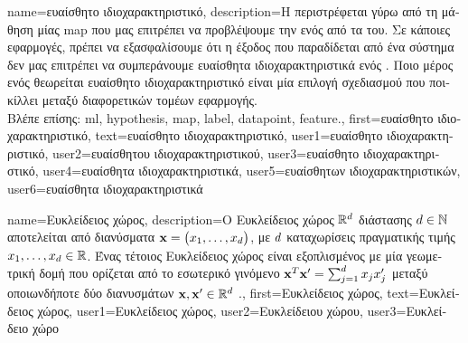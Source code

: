 {name={\foreignlanguage{greek}{ευαίσθητο ιδιοχαρακτηριστικό}},
	description={\foreignlanguage{greek}{Η}  
		\foreignlanguage{greek}{περιστρέφεται γύρω από τη μάθηση μίας} \gls{map}  
		\foreignlanguage{greek}{που μας επιτρέπει να προβλέψουμε την}  \foreignlanguage{greek}{ενός} 
		 \foreignlanguage{greek}{από τα}  \foreignlanguage{greek}{του}. 
		\foreignlanguage{greek}{Σε κάποιες εφαρμογές, πρέπει να εξασφαλίσουμε ότι η έξοδος που παραδίδεται 
		από ένα σύστημα}  \foreignlanguage{greek}{δεν μας επιτρέπει να συμπεράνουμε 
		ευαί\-σθητα ιδιοχαρακτηριστικά ενός} . \foreignlanguage{greek}{Ποιο μέρος  
		ενός}  \foreignlanguage{greek}{θεωρείται ευαίσθητο ιδιοχαρακτηριστικό είναι μία 
		επιλογή σχεδιασμού που ποικίλλει μεταξύ διαφορετικών τομέων εφαρμογής.}\\
		\foreignlanguage{greek}{Βλέπε επίσης:} \gls{ml}, \gls{hypothesis}, \gls{map}, \gls{label}, \gls{datapoint}, \gls{feature}.},
	first={\foreignlanguage{greek}{ευαίσθητο ιδιοχαρακτηριστικό}},
	text={\foreignlanguage{greek}{ευαίσθητο ιδιοχαρακτηριστικό}},
	user1={\foreignlanguage{greek}{ευαίσθητο ιδιοχαρακτηριστικό}}, %
    	user2={\foreignlanguage{greek}{ευαίσθητου ιδιοχαρακτηριστικού}}, %
	user3={\foreignlanguage{greek}{ευαίσθητο ιδιοχαρακτηριστικό}}, %
	user4={\foreignlanguage{greek}{ευαίσθητα ιδιοχαρακτηριστικά}}, %
    	user5={\foreignlanguage{greek}{ευαίσθητων ιδιοχαρακτηριστικών}}, %
	user6={\foreignlanguage{greek}{ευαίσθητα ιδιοχαρακτηριστικά}} %
}

{name={\foreignlanguage{greek}{Ευκλείδειος χώρος}}, 
	description={\foreignlanguage{greek}{Ο Ευκλείδειος χώρος} 
		$\mathbb{R}^{d}$ \foreignlanguage{greek}{διάστασης $d \in \mathbb{N}$ αποτελείται 
		από διανύσματα ${\bf x}= \big(x_{1}, \ldots, x_{d}\big)$, με $d$ 
		καταχωρίσεις πραγματικής τιμής $x_{1}, \ldots, x_{d} \in \mathbb{R}$. 
		Ένας τέτοιος Ευκλείδειος χώρος είναι εξοπλισμένος με μία γεωμετρική δομή 
		που ορίζεται από το εσωτερικό γινόμενο 
		${\bf x}^{T} {\bf x}' = \sum_{j=1}^{d} x_{j} x'_{j}$ 
		μεταξύ οποιωνδήποτε δύο διανυσμάτων} ${\bf x},{\bf x}' \in \mathbb{R}^{d}$ \cite{RudinBookPrinciplesMatheAnalysis}.},
	first={\foreignlanguage{greek}{Ευκλείδειος χώρος}}, 
	text={\foreignlanguage{greek}{Ευκλείδειος χώρος}},
	user1={\foreignlanguage{greek}{Ευκλείδειος χώρος}}, %
  	user2={\foreignlanguage{greek}{Ευκλείδειου χώρου}}, %
	user3={\foreignlanguage{greek}{Ευ\-κλεί\-δει\-ο χώρο}} %
}

